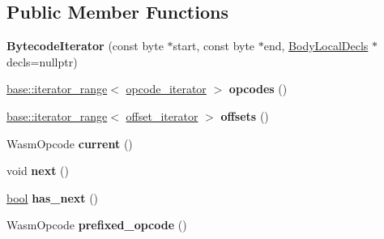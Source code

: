 \subsection*{Public Member Functions}
\begin{DoxyCompactItemize}
\item 
\mbox{\label{classv8_1_1internal_1_1wasm_1_1BytecodeIterator_afca8ac710cd3b4fd187f465c8772b6ce}} 
{\bfseries Bytecode\+Iterator} (const byte $\ast$start, const byte $\ast$end, \mbox{\hyperlink{structv8_1_1internal_1_1wasm_1_1BodyLocalDecls}{Body\+Local\+Decls}} $\ast$decls=nullptr)
\item 
\mbox{\label{classv8_1_1internal_1_1wasm_1_1BytecodeIterator_a6238ab63341d65ee905b1719c43b01a4}} 
\mbox{\hyperlink{classv8_1_1base_1_1iterator__range}{base\+::iterator\+\_\+range}}$<$ \mbox{\hyperlink{classv8_1_1internal_1_1wasm_1_1BytecodeIterator_1_1opcode__iterator}{opcode\+\_\+iterator}} $>$ {\bfseries opcodes} ()
\item 
\mbox{\label{classv8_1_1internal_1_1wasm_1_1BytecodeIterator_a1f2a5db083d1a2306739605f85c6c875}} 
\mbox{\hyperlink{classv8_1_1base_1_1iterator__range}{base\+::iterator\+\_\+range}}$<$ \mbox{\hyperlink{classv8_1_1internal_1_1wasm_1_1BytecodeIterator_1_1offset__iterator}{offset\+\_\+iterator}} $>$ {\bfseries offsets} ()
\item 
\mbox{\label{classv8_1_1internal_1_1wasm_1_1BytecodeIterator_a629869a6270842a211f8c53c7decf8ba}} 
Wasm\+Opcode {\bfseries current} ()
\item 
\mbox{\label{classv8_1_1internal_1_1wasm_1_1BytecodeIterator_aeffa27162f4dce4f196670293525d1cb}} 
void {\bfseries next} ()
\item 
\mbox{\label{classv8_1_1internal_1_1wasm_1_1BytecodeIterator_ade698e29c6c371e62fed768588316e1f}} 
\mbox{\hyperlink{classbool}{bool}} {\bfseries has\+\_\+next} ()
\item 
\mbox{\label{classv8_1_1internal_1_1wasm_1_1BytecodeIterator_ae8c3928828a7fe73a49ea2d212470afe}} 
Wasm\+Opcode {\bfseries prefixed\+\_\+opcode} ()
\end{DoxyCompactItemize}


